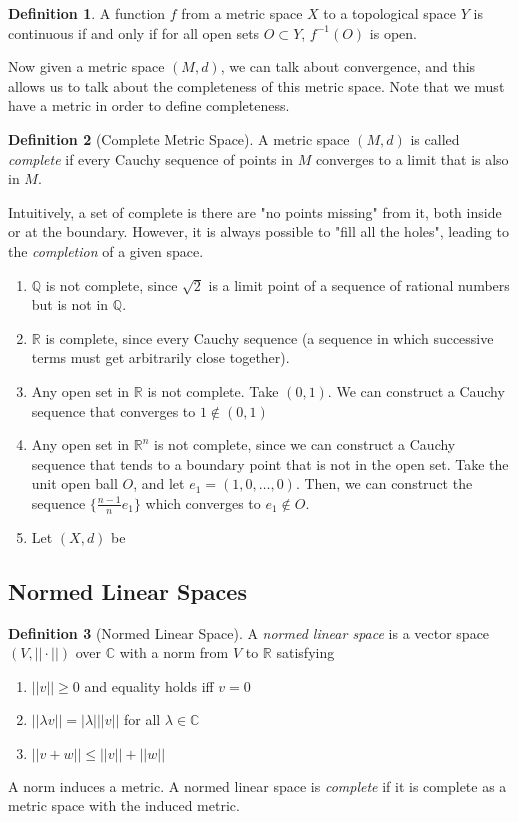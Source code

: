 \documentclass{article}
\theoremstyle{remark}
\theoremstyle{definition}
\newtheorem{definition}{Definition}[section]
\begin{document}
\begin{definition}
A function $f$ from a metric space $X$ to a topological space $Y$ is continuous if and only if for all open sets $O \subset Y$, $f^{-1} (O)$ is open. 
\end{definition}

Now given a metric space $(M, d)$, we can talk about convergence, and this allows us to talk about the completeness of this metric space. Note that we must have a metric in order to define completeness. 

\begin{definition}[Complete Metric Space]
A metric space $(M, d)$ is called \textit{complete} if every Cauchy sequence of points in $M$ converges to a limit that is also in $M$. 
\end{definition}

Intuitively, a set of complete is there are "no points missing" from it, both inside or at the boundary. However, it is always possible to "fill all the holes", leading to the \textit{completion} of a given space. 
\begin{enumerate}
    \item $\mathbb{Q}$ is not complete, since $\sqrt{2}$ is a limit point of a sequence of rational numbers but is not in $\mathbb{Q}$. 
    \item $\mathbb{R}$ is complete, since every Cauchy sequence (a sequence in which successive terms must get arbitrarily close together). 
    \item Any open set in $\mathbb{R}$ is not complete. Take $(0, 1)$. We can construct a Cauchy sequence that converges to $1 \not\in (0, 1)$ 
    \item Any open set in $\mathbb{R}^n$ is not complete, since we can construct a Cauchy sequence that tends to a boundary point that is not in the open set. Take the unit open ball $O$, and let $e_1 = (1, 0, \ldots, 0)$. Then, we can construct the sequence $\{\frac{n-1}{n} e_1\}$ which converges to $e_1 \not\in O$. 
    \item Let $(X, d)$ be 
\end{enumerate}

\subsection{Normed Linear Spaces}

\begin{definition}[Normed Linear Space]
A \textit{normed linear space} is a vector space $(V, ||\cdot||)$ over $\mathbb{C}$ with a norm from $V$ to $\mathbb{R}$ satisfying 
\begin{enumerate}
    \item $||v|| \geq 0$ and equality holds iff $v = 0$ 
    \item $||\lambda v || = |\lambda| ||v||$ for all $\lambda \in \mathbb{C}$
    \item $||v + w|| \leq ||v|| + ||w||$
\end{enumerate}
A norm induces a metric. A normed linear space is \textit{complete} if it is complete as a metric space with the induced metric. 
\end{definition}
\end{document}
